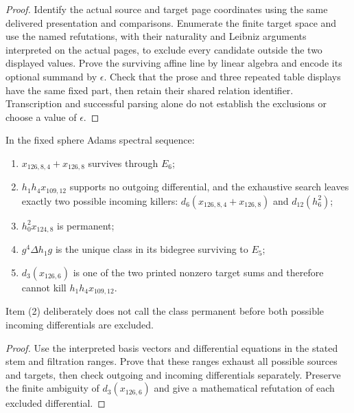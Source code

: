 \begin{proof}
  Identify the actual source and target page coordinates using the same
  delivered presentation and comparisons. Enumerate the finite target space
  and use the named refutations, with their naturality and Leibniz arguments
  interpreted on the actual pages, to exclude every candidate outside the
  two displayed values. Prove the surviving affine line by linear algebra
  and encode its optional summand by $\epsilon$. Check that the prose and
  three repeated table displays have the same fixed part, then retain their
  shared relation identifier. Transcription and successful parsing alone do
  not establish the exclusions or choose a value of $\epsilon$.
\end{proof}

\begin{proposition}
  \label{evidence:near126-core}
  \notready
  In the fixed sphere Adams spectral sequence:
  \begin{enumerate}
    \item $x_{126,8,4}+x_{126,8}$ survives through $E_6$;
    \item $h_1h_4x_{109,12}$ supports no outgoing differential, and the
      exhaustive search leaves exactly two possible incoming killers:
      $d_6(x_{126,8,4}+x_{126,8})$ and $d_{12}(h_6^2)$;
    \item $h_0^2x_{124,8}$ is permanent;
    \item $g^4\Delta h_1g$ is the unique class in its bidegree surviving to
      $E_5$;
    \item $d_3(x_{126,6})$ is one of the two printed nonzero target sums and
      therefore cannot kill $h_1h_4x_{109,12}$.
  \end{enumerate}
  Item (2) deliberately does not call the class permanent before both possible
  incoming differentials are excluded.
\end{proposition}

\begin{proof}
  Use the interpreted basis vectors and differential equations in the
  stated stem and filtration ranges. Prove that these ranges exhaust all
  possible sources and targets, then check outgoing and incoming
  differentials separately. Preserve the finite ambiguity of $d_3(x_{126,6})$
  and give a mathematical refutation of each excluded differential.
\end{proof}

